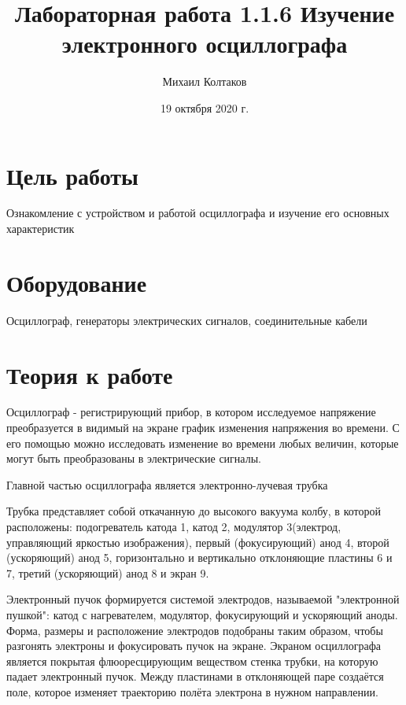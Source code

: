 \documentclass[a4paper, 12pt]{article}
\title{Лабораторная работа 1.1.6 Изучение электронного осциллографа}
\author{Михаил Колтаков}
\date{19 октября 2020 г.}
\begin{document}
	\maketitle
	\section*{Цель работы}
		Ознакомление с устройством и работой осциллографа и изучение его основных характеристик
	\section*{Оборудование}
		Осциллограф, генераторы электрических сигналов, соединительные кабели
	\section*{Теория к работе}
		Осциллограф - регистрирующий прибор, в котором исследуемое напряжение преобразуется в видимый на экране график изменения напряжения во времени. С его помощью можно исследовать изменение во времени любых величин, которые могут быть преобразованы в электрические сигналы.
		\par
		Главной частью осциллографа является электронно-лучевая трубка
		\begin{figure}[h]
		\end{figure}
	
		Трубка представляет собой откачанную до высокого вакуума колбу, в которой расположены: подогреватель катода 1, катод 2, модулятор 3(электрод, управляющий яркостью изображения), первый (фокусирующий) анод 4, второй (ускоряющий) анод 5, горизонтально и вертикально отклоняющие пластины 6 и 7, третий (ускоряющий) анод 8 и экран 9.
		
		Электронный пучок формируется системой электродов, называемой "электронной пушкой": катод с нагревателем, модулятор, фокусирующий и ускоряющий аноды. Форма, размеры и расположение электродов подобраны таким образом, чтобы разгонять электроны и фокусировать пучок на экране. Экраном осциллографа является покрытая флюоресцирующим веществом стенка трубки, на которую падает электронный пучок. Между пластинами в отклоняющей паре создаётся поле, которое изменяет траекторию полёта электрона в нужном направлении.
		
\end{document}
